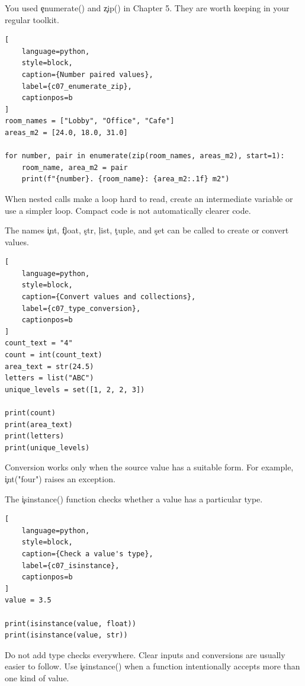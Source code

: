 
You used \c{enumerate()} and \c{zip()} in Chapter 5. They are worth keeping in
your regular toolkit.

\begin{lstlisting}[
    language=python,
    style=block,
    caption={Number paired values},
    label={c07_enumerate_zip},
    captionpos=b
]
room_names = ["Lobby", "Office", "Cafe"]
areas_m2 = [24.0, 18.0, 31.0]

for number, pair in enumerate(zip(room_names, areas_m2), start=1):
    room_name, area_m2 = pair
    print(f"{number}. {room_name}: {area_m2:.1f} m2")
\end{lstlisting}

When nested calls make a loop hard to read, create an intermediate variable or
use a simpler loop. Compact code is not automatically clearer code.


The names \c{int}, \c{float}, \c{str}, \c{list}, \c{tuple}, and \c{set} can be
called to create or convert values.

\begin{lstlisting}[
    language=python,
    style=block,
    caption={Convert values and collections},
    label={c07_type_conversion},
    captionpos=b
]
count_text = "4"
count = int(count_text)
area_text = str(24.5)
letters = list("ABC")
unique_levels = set([1, 2, 2, 3])

print(count)
print(area_text)
print(letters)
print(unique_levels)
\end{lstlisting}

Conversion works only when the source value has a suitable form. For example,
\c{int("four")} raises an exception.


The \c{isinstance()} function checks whether a value has a particular type.

\begin{lstlisting}[
    language=python,
    style=block,
    caption={Check a value's type},
    label={c07_isinstance},
    captionpos=b
]
value = 3.5

print(isinstance(value, float))
print(isinstance(value, str))
\end{lstlisting}

Do not add type checks everywhere. Clear inputs and conversions are usually
easier to follow. Use \c{isinstance()} when a function intentionally accepts
more than one kind of value.

